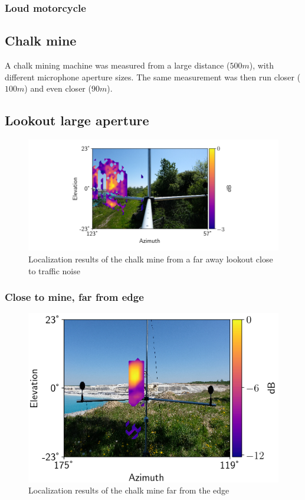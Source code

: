 \subsubsection{Loud motorcycle}
\subsection{Chalk mine}
A chalk mining machine was measured from a large distance ($500m$), with different microphone aperture sizes. The same measurement was then run closer ($100m$) and even closer ($90m$).
\subsection{Lookout large aperture}
\begin{figure}[H]
    \centering
    \includegraphics[width=1\textwidth]{Figures/ChalkFarFar.png}
    \caption{Localization results of the chalk mine from a far away lookout close to traffic noise}
    \label{fig:ChalkCLose}
\end{figure}
\subsubsection{Close to mine, far from edge}
\begin{figure}[H]
    \centering
    \includegraphics[width=1\textwidth]{Figures/ChalkFar.png}
    \caption{Localization results of the chalk mine far from the edge}
    \label{fig:ChalkCLose}
\end{figure}
